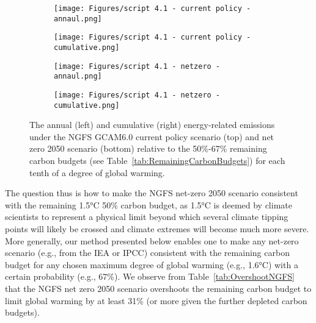\documentclass[11pt,a4paper,table,xcdraw]{article}
\begin{document}
\begin{figure}[H]
    \centering
    \begin{subfigure}{0.48\textwidth}
        \centering
        \texttt{[image: Figures/script 4.1 - current policy - annaul.png]}
    \end{subfigure}
    \hfill
    \begin{subfigure}{0.48\textwidth}
        \centering
        \texttt{[image: Figures/script 4.1 - current policy - cumulative.png]}
    \end{subfigure}

    \vspace{1em}

    \begin{subfigure}{0.48\textwidth}
        \centering
        \texttt{[image: Figures/script 4.1 - netzero - annaul.png]}
    \end{subfigure}
    \hfill
    \begin{subfigure}{0.48\textwidth}
        \centering
        \texttt{[image: Figures/script 4.1 - netzero - cumulative.png]}
    \end{subfigure}
    \caption{The annual (left) and cumulative (right) energy-related emissions under the NGFS GCAM6.0 current policy scenario (top) and net zero 2050 scenario (bottom) relative to the 50\%-67\% remaining carbon budgets (see Table~\ref{tab:RemainingCarbonBudgets}) for each tenth of a degree of global warming.}\label{fig:BAUNZScenarios}
\end{figure}

The question thus is how to make the NGFS net-zero 2050 scenario consistent with the remaining 1.5°C 50\% carbon budget, as 1.5°C is deemed by climate scientists to represent a physical limit beyond which several climate tipping points will likely be crossed and climate extremes will become much more severe. More generally, our method presented below enables one to make any net-zero scenario (e.g., from the IEA or IPCC) consistent with the remaining carbon budget for any chosen maximum degree of global warming (e.g., 1.6°C) with a certain probability (e.g., 67\%).\newline
\indent We observe from Table~\ref{tab:OvershootNGFS} that the NGFS net zero 2050 scenario overshoots the remaining carbon budget to limit global warming by at least 31\% (or more given the further depleted carbon budgets).\newline
\end{document}
